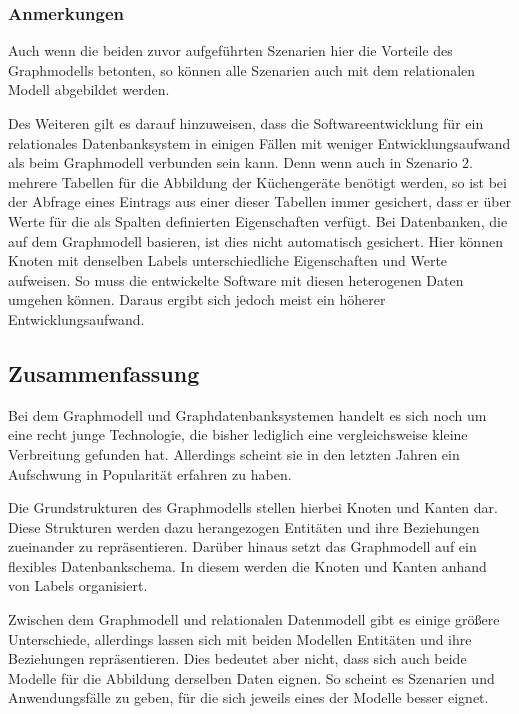 \subsubsection{Anmerkungen}
Auch wenn die beiden zuvor aufgeführten Szenarien hier die Vorteile des Graphmodells betonten, so können alle Szenarien auch mit dem relationalen Modell abgebildet werden. 

Des Weiteren gilt es darauf hinzuweisen, dass die Softwareentwicklung für ein relationales Datenbanksystem in einigen Fällen mit weniger Entwicklungsaufwand als beim Graphmodell verbunden sein kann. Denn wenn auch in Szenario 2. mehrere Tabellen für die Abbildung der Küchengeräte benötigt werden, so ist bei der Abfrage eines Eintrags aus einer dieser Tabellen immer gesichert, dass er über Werte für die als Spalten definierten Eigenschaften verfügt. Bei Datenbanken, die auf dem Graphmodell basieren, ist dies nicht automatisch gesichert. Hier können Knoten mit denselben Labels unterschiedliche Eigenschaften und Werte aufweisen. So muss die entwickelte Software mit diesen heterogenen Daten umgehen können. Daraus ergibt sich jedoch meist ein höherer Entwicklungsaufwand. 

\subsection{Zusammenfassung}
Bei dem Graphmodell und Graphdatenbanksystemen handelt es sich noch um eine recht junge Technologie, die bisher lediglich eine vergleichsweise kleine Verbreitung gefunden hat. Allerdings scheint sie in den letzten Jahren ein Aufschwung in Popularität erfahren zu haben. 

Die Grundstrukturen des Graphmodells stellen hierbei Knoten und Kanten dar. Diese Strukturen werden dazu herangezogen Entitäten und ihre Beziehungen zueinander zu repräsentieren. Darüber hinaus setzt das Graphmodell auf ein flexibles Datenbankschema. In diesem werden die Knoten und Kanten anhand von Labels organisiert.

Zwischen dem Graphmodell und relationalen Datenmodell gibt es einige größere Unterschiede, allerdings lassen sich mit beiden Modellen Entitäten und ihre Beziehungen repräsentieren. Dies bedeutet aber nicht, dass sich auch beide Modelle für die Abbildung derselben Daten eignen. So scheint es Szenarien und Anwendungsfälle zu geben, für die sich jeweils eines der Modelle besser eignet. 

